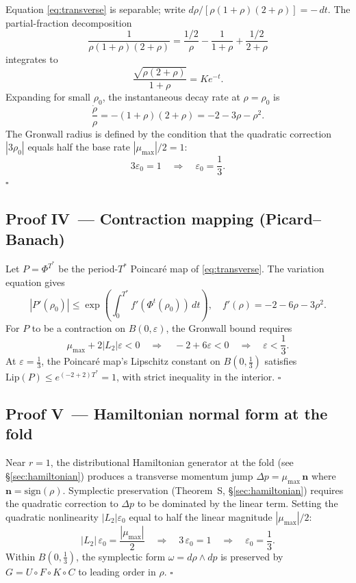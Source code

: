 \documentclass[14pt,a4paper]{extarticle}
\begin{document}
Equation \eqref{eq:transverse} is separable; write
$d\rho/[\rho(1+\rho)(2+\rho)] = -\,dt$.
The partial-fraction decomposition
\[
  \frac{1}{\rho(1+\rho)(2+\rho)}
    = \frac{1/2}{\rho} - \frac{1}{1+\rho} + \frac{1/2}{2+\rho}
\]
integrates to
\[
  \frac{\sqrt{\rho(2+\rho)}}{1+\rho} = K e^{-t}.
\]
Expanding for small $\rho_0$, the instantaneous decay rate at $\rho = \rho_0$ is
\[
  \frac{\dot\rho}{\rho} = -(1+\rho)(2+\rho) = -2 - 3\rho - \rho^2.
\]
The Gronwall radius is defined by the condition that the quadratic correction
$|3\rho_0|$ equals half the base rate $|\mu_{\max}|/2 = 1$:
\[
  3\varepsilon_0 = 1
  \quad\Longrightarrow\quad
  \varepsilon_0 = \frac{1}{3}.
\]
\hfill$\square$

\subsection*{Proof IV\, — Contraction mapping (Picard--Banach)}

Let $P = \Phi^{T^*}$ be the period-$T^*$ Poincar\'e map of \eqref{eq:transverse}.
The variation equation gives
\[
  |P'(\rho_0)|
    \le \exp\!\left(\int_0^{T^*}\! f'(\Phi^t(\rho_0))\,dt\right),
  \quad
  f'(\rho) = -2 - 6\rho - 3\rho^2.
\]
For $P$ to be a contraction on $B(0,\varepsilon)$, the Gronwall bound requires
\[
  \mu_{\max} + 2|L_2|\varepsilon < 0
  \quad\Longrightarrow\quad
  -2 + 6\varepsilon < 0
  \quad\Longrightarrow\quad
  \varepsilon < \frac{1}{3}.
\]
At $\varepsilon = \tfrac{1}{3}$, the Poincar\'e map's Lipschitz constant
on $B(0,\tfrac{1}{3})$ satisfies $\mathrm{Lip}(P) \le e^{(-2+2)T^*} = 1$,
with strict inequality in the interior.
\hfill$\square$

\subsection*{Proof V\, — Hamiltonian normal form at the fold}

Near $r=1$, the distributional Hamiltonian generator at the fold
(see \S\ref{sec:hamiltonian}) produces a transverse momentum jump
$\Delta p = \mu_{\max}\,\mathbf{n}$ where $\mathbf{n} = \mathrm{sign}(\rho)$.
Symplectic preservation (Theorem~S, \S\ref{sec:hamiltonian}) requires
the quadratic correction to $\Delta p$ to be dominated by the linear term.
Setting the quadratic nonlinearity $|L_2|\varepsilon_0$ equal to half the
linear magnitude $|\mu_{\max}|/2$:
\[
  |L_2|\,\varepsilon_0 = \frac{|\mu_{\max}|}{2}
  \quad\Longrightarrow\quad
  3\,\varepsilon_0 = 1
  \quad\Longrightarrow\quad
  \varepsilon_0 = \frac{1}{3}.
\]
Within $B(0,\tfrac{1}{3})$, the symplectic form $\omega = d\rho\wedge dp$
is preserved by $G = U\circ F\circ K\circ C$ to leading order in $\rho$.
\hfill$\square$
\end{document}
